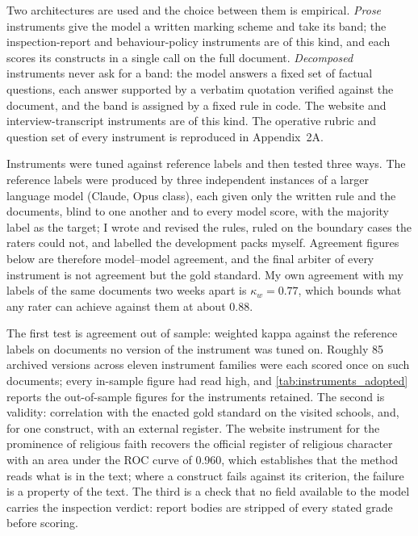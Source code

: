 Two architectures are used and the choice between them is empirical.
\emph{Prose} instruments give the model a written marking scheme and take its
band; the inspection-report and behaviour-policy instruments are of this
kind, and each scores its constructs in a single call on the full document.
\emph{Decomposed} instruments never ask for a band: the model answers a fixed
set of factual questions, each answer supported by a verbatim quotation
verified against the document, and the band is assigned by a fixed rule in
code. The website and interview-transcript instruments are of this kind. The
operative rubric and question set of every instrument is reproduced in
Appendix~2A.

Instruments were tuned against reference labels and then tested three ways.
The reference labels were produced by three independent instances of a
larger language model (Claude, Opus class), each given only the written rule
and the documents, blind to one another and to every model score, with the
majority label as the target; I wrote and revised the rules, ruled on the
boundary cases the raters could not, and labelled the development packs
myself. Agreement figures below are therefore model--model agreement, and the
final arbiter of every instrument is not agreement but the gold standard. My
own agreement with my labels of the same documents two weeks apart is
$\kappa_w = 0.77$, which bounds what any rater can achieve against them at
about $0.88$.

The first test is agreement out of sample: weighted kappa against the
reference labels on documents no version of the instrument was tuned on.
Roughly 85 archived versions across eleven instrument families were each
scored once on such documents; every in-sample figure had read high, and
\cref{tab:instruments_adopted} reports the out-of-sample figures for the
instruments retained. The second is validity: correlation with the enacted
gold standard on the visited schools, and, for one construct, with an
external register. The website instrument for the prominence of religious
faith recovers the official register of religious character with an area
under the ROC curve of 0.960, which establishes that the method reads what is
in the text; where a construct fails against its criterion, the failure is a
property of the text. The third is a check that no field available to the
model carries the inspection verdict: report bodies are stripped of every
stated grade before scoring.



